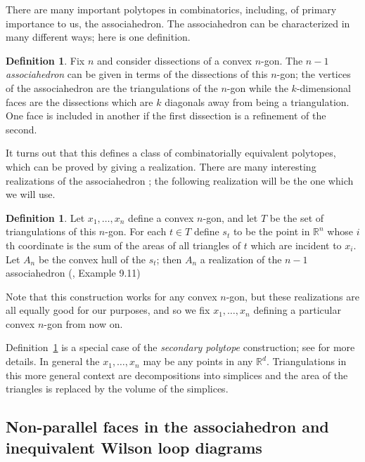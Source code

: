 \documentclass[11pt]{article}
\theoremstyle{remark}
\theoremstyle{definition}
\newtheorem{dfn}[thm]{Definition}
\begin{document}
There are many important polytopes in combinatorics, including, of primary importance to us, the associahedron. The associahedron can be characterized in many different ways; here is one definition.

\begin{dfn}\label{def:associahedron}
Fix $n$ and consider dissections of a convex $n$-gon.  The $n-1$ {\em associahedron} can be given in terms of the dissections of this $n$-gon; the vertices of the associahedron are the triangulations of the $n$-gon while the $k$-dimensional faces are the dissections which are $k$ diagonals away from being a triangulation.  One face is included in another if the first dissection is a refinement of the second. 
\end{dfn}

It turns out that this defines a class of combinatorially equivalent polytopes, which can be proved by giving a realization.  There are many interesting realizations of the associahedron \cite{CSZinequivalent}; the following realization will be the one which we will use.  

\begin{dfn}\label{def:secondary polytope}
  Let $x_1, \ldots, x_n$ define a convex $n$-gon, and let $T$ be the set of triangulations of this $n$-gon.  For each $t\in T$ define $s_t$ to be the point in $\mathbb{R}^n$ whose $i$th coordinate is the sum of the areas of all triangles of $t$ which are incident to $x_i$.  Let $A_n$ be the convex hull of the $s_t$; then $A_n$ a realization of the $n-1$ associahedron (\cite{Ziegler}, Example 9.11)
\end{dfn}
Note that this construction works for any convex $n$-gon, but these realizations are all equally good for our purposes, and so we fix $x_1, \ldots, x_n$ defining a particular convex $n$-gon from now on.


Definition~\ref{def:secondary polytope} is a special case of the {\em secondary polytope} construction; see \cite[Definition 9.9]{Ziegler} for more details.  In general the $x_1, \ldots, x_n$ may be any points in any $\mathbb{R}^d$.  Triangulations in this more general context are decompositions into simplices and the area of the triangles is replaced by the volume of the simplices.  




\subsection{Non-parallel faces in the associahedron and inequivalent Wilson loop diagrams}\label{sec associahedron results}
\end{document}
